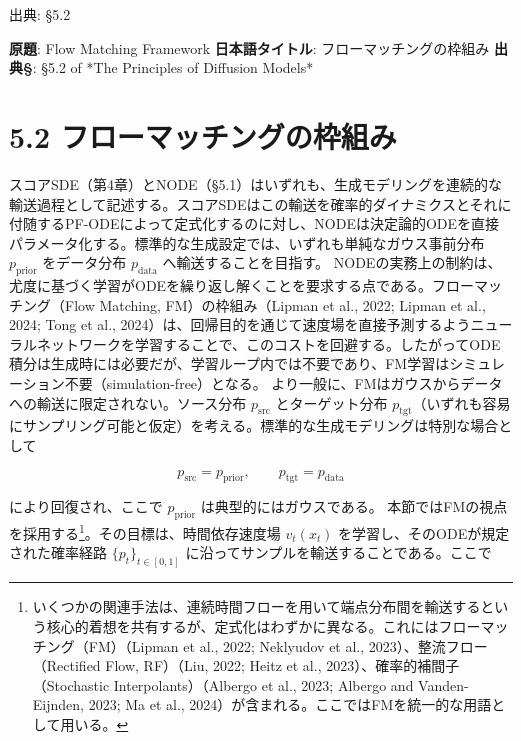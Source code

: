 

{\color{gray}\footnotesize 出典: §5.2\par}
\vspace{0.2em}
\begin{propositionbox}[原題]
\textbf{原題}: Flow Matching Framework
\textbf{日本語タイトル}: フローマッチングの枠組み
\textbf{出典§}: §5.2 of *The Principles of Diffusion Models*
\end{propositionbox}


\section*{5.2 フローマッチングの枠組み}


スコアSDE（第4章）とNODE（§5.1）はいずれも、生成モデリングを連続的な輸送過程として記述する。スコアSDEはこの輸送を確率的ダイナミクスとそれに付随するPF-ODEによって定式化するのに対し、NODEは決定論的ODEを直接パラメータ化する。標準的な生成設定では、いずれも単純なガウス事前分布 $p_{\mathrm{prior}}$ をデータ分布 $p_{\mathrm{data}}$ へ輸送することを目指す。
NODEの実務上の制約は、尤度に基づく学習がODEを繰り返し解くことを要求する点である。フローマッチング（Flow Matching, FM）の枠組み（Lipman et al., 2022; Lipman et al., 2024; Tong et al., 2024）は、回帰目的を通じて速度場を直接予測するようニューラルネットワークを学習することで、このコストを回避する。したがってODE積分は生成時には必要だが、学習ループ内では不要であり、FM学習はシミュレーション不要（simulation-free）となる。
より一般に、FMはガウスからデータへの輸送に限定されない。ソース分布 $p_{\mathrm{src}}$ とターゲット分布 $p_{\mathrm{tgt}}$（いずれも容易にサンプリング可能と仮定）を考える。標準的な生成モデリングは特別な場合として

\[
p_{\mathrm{src}} = p_{\mathrm{prior}}, \qquad p_{\mathrm{tgt}} = p_{\mathrm{data}}
\]


により回復され、ここで $p_{\mathrm{prior}}$ は典型的にはガウスである。
本節ではFMの視点を採用する\footnote{いくつかの関連手法は、連続時間フローを用いて端点分布間を輸送するという核心的着想を共有するが、定式化はわずかに異なる。これにはフローマッチング（FM）（Lipman et al., 2022; Neklyudov et al., 2023）、整流フロー（Rectified Flow, RF）（Liu, 2022; Heitz et al., 2023）、確率的補間子（Stochastic Interpolants）（Albergo et al., 2023; Albergo and Vanden-Eijnden, 2023; Ma et al., 2024）が含まれる。ここではFMを統一的な用語として用いる。}。その目標は、時間依存速度場 $v_t(x_t)$ を学習し、そのODEが規定された確率経路 $\{p_t\}_{t\in[0,1]}$ に沿ってサンプルを輸送することである。ここで

